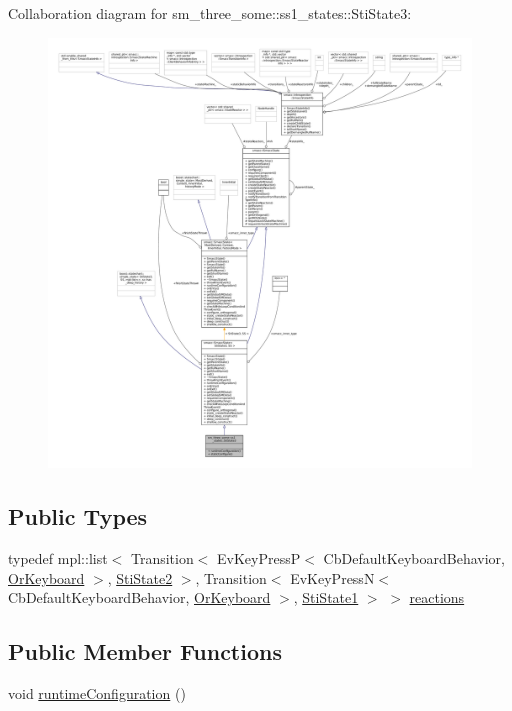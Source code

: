 Collaboration diagram for sm\+\_\+three\+\_\+some\+:\+:ss1\+\_\+states\+:\+:Sti\+State3\+:
\nopagebreak
\begin{figure}[H]
\begin{center}
\leavevmode
\includegraphics[width=350pt]{structsm__three__some_1_1ss1__states_1_1StiState3__coll__graph}
\end{center}
\end{figure}
\subsection*{Public Types}
\begin{DoxyCompactItemize}
\item 
typedef mpl\+::list$<$ Transition$<$ Ev\+Key\+PressP$<$ Cb\+Default\+Keyboard\+Behavior, \hyperlink{classsm__three__some_1_1OrKeyboard}{Or\+Keyboard} $>$, \hyperlink{structsm__three__some_1_1ss1__states_1_1StiState2}{Sti\+State2} $>$, Transition$<$ Ev\+Key\+PressN$<$ Cb\+Default\+Keyboard\+Behavior, \hyperlink{classsm__three__some_1_1OrKeyboard}{Or\+Keyboard} $>$, \hyperlink{structsm__three__some_1_1ss1__states_1_1StiState1}{Sti\+State1} $>$ $>$ \hyperlink{structsm__three__some_1_1ss1__states_1_1StiState3_a2672f9f53573401ff5b62b95bf4d7b47}{reactions}
\end{DoxyCompactItemize}
\subsection*{Public Member Functions}
\begin{DoxyCompactItemize}
\item 
void \hyperlink{structsm__three__some_1_1ss1__states_1_1StiState3_a92381db4fd86ce5a4ce32c96b9fd3a83}{runtime\+Configuration} ()
\end{DoxyCompactItemize}
